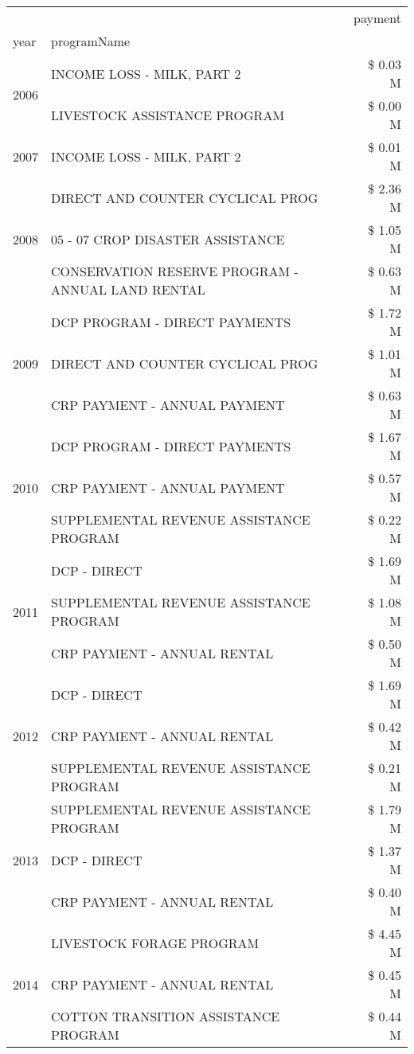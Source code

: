 \begin{tabular}{llr}
\toprule
 &  & payment \\
year & programName &  \\
\midrule
\multirow[t]{2}{*}{2006} & INCOME LOSS - MILK, PART 2 & \$ 0.03 M \\
 & LIVESTOCK ASSISTANCE PROGRAM & \$ 0.00 M \\
\cline{1-3}
2007 & INCOME LOSS - MILK, PART 2 & \$ 0.01 M \\
\cline{1-3}
\multirow[t]{3}{*}{2008} & DIRECT AND COUNTER CYCLICAL PROG & \$ 2.36 M \\
 & 05 - 07 CROP DISASTER ASSISTANCE & \$ 1.05 M \\
 & CONSERVATION RESERVE PROGRAM - ANNUAL LAND RENTAL & \$ 0.63 M \\
\cline{1-3}
\multirow[t]{3}{*}{2009} & DCP PROGRAM - DIRECT PAYMENTS & \$ 1.72 M \\
 & DIRECT AND COUNTER CYCLICAL PROG & \$ 1.01 M \\
 & CRP PAYMENT - ANNUAL PAYMENT & \$ 0.63 M \\
\cline{1-3}
\multirow[t]{3}{*}{2010} & DCP PROGRAM - DIRECT PAYMENTS & \$ 1.67 M \\
 & CRP PAYMENT - ANNUAL PAYMENT & \$ 0.57 M \\
 & SUPPLEMENTAL REVENUE ASSISTANCE PROGRAM & \$ 0.22 M \\
\cline{1-3}
\multirow[t]{3}{*}{2011} & DCP - DIRECT & \$ 1.69 M \\
 & SUPPLEMENTAL REVENUE ASSISTANCE PROGRAM & \$ 1.08 M \\
 & CRP PAYMENT - ANNUAL RENTAL & \$ 0.50 M \\
\cline{1-3}
\multirow[t]{3}{*}{2012} & DCP - DIRECT & \$ 1.69 M \\
 & CRP PAYMENT - ANNUAL RENTAL & \$ 0.42 M \\
 & SUPPLEMENTAL REVENUE ASSISTANCE PROGRAM & \$ 0.21 M \\
\cline{1-3}
\multirow[t]{3}{*}{2013} & SUPPLEMENTAL REVENUE ASSISTANCE PROGRAM & \$ 1.79 M \\
 & DCP - DIRECT & \$ 1.37 M \\
 & CRP PAYMENT - ANNUAL RENTAL & \$ 0.40 M \\
\cline{1-3}
\multirow[t]{3}{*}{2014} & LIVESTOCK FORAGE PROGRAM & \$ 4.45 M \\
 & CRP PAYMENT - ANNUAL RENTAL & \$ 0.45 M \\
 & COTTON TRANSITION ASSISTANCE PROGRAM & \$ 0.44 M \\

\end{tabular}
